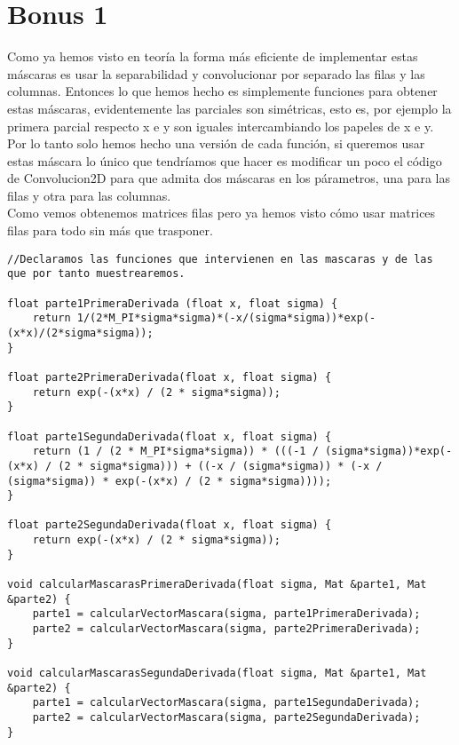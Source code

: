 \documentclass[10pt,a4paper]{article}
\begin{document}
\section*{Bonus 1}

Como ya hemos visto en teoría la forma más eficiente de implementar estas máscaras es usar la separabilidad y convolucionar por separado las filas y las columnas. Entonces lo que hemos hecho es simplemente funciones para obtener estas máscaras, evidentemente las parciales son simétricas, esto es, por ejemplo la primera parcial respecto x e y son iguales intercambiando los papeles de x e y.\\

Por lo tanto solo hemos hecho una versión de cada función, si queremos usar estas máscara lo único que tendríamos que hacer es modificar un poco el código de Convolucion2D para que admita dos máscaras en los párametros, una para las filas y otra para las columnas.\\

Como vemos obtenemos matrices filas pero ya hemos visto cómo usar matrices filas para todo sin más que trasponer.\\

\begin{lstlisting}
//Declaramos las funciones que intervienen en las mascaras y de las que por tanto muestrearemos.

float parte1PrimeraDerivada (float x, float sigma) {
	return 1/(2*M_PI*sigma*sigma)*(-x/(sigma*sigma))*exp(-(x*x)/(2*sigma*sigma));
}

float parte2PrimeraDerivada(float x, float sigma) {
	return exp(-(x*x) / (2 * sigma*sigma));
}

float parte1SegundaDerivada(float x, float sigma) {
	return (1 / (2 * M_PI*sigma*sigma)) * (((-1 / (sigma*sigma))*exp(-(x*x) / (2 * sigma*sigma))) + ((-x / (sigma*sigma)) * (-x / (sigma*sigma)) * exp(-(x*x) / (2 * sigma*sigma))));
}

float parte2SegundaDerivada(float x, float sigma) {
	return exp(-(x*x) / (2 * sigma*sigma));
}

void calcularMascarasPrimeraDerivada(float sigma, Mat &parte1, Mat &parte2) {
	parte1 = calcularVectorMascara(sigma, parte1PrimeraDerivada);
	parte2 = calcularVectorMascara(sigma, parte2PrimeraDerivada);
}

void calcularMascarasSegundaDerivada(float sigma, Mat &parte1, Mat &parte2) {
	parte1 = calcularVectorMascara(sigma, parte1SegundaDerivada);
	parte2 = calcularVectorMascara(sigma, parte2SegundaDerivada);
}
\end{lstlisting}
\end{document}
